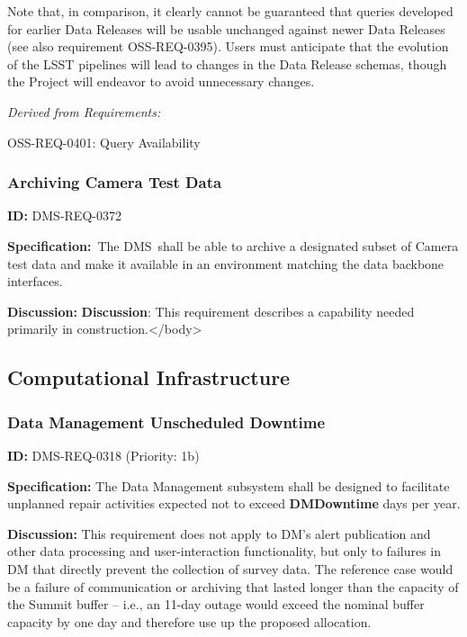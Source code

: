 \documentclass[SE,toc,lsstdraft]{lsstdoc}
\begin{document}
Note that, in comparison, it clearly cannot be guaranteed that queries developed for earlier Data Releases will be usable unchanged against newer Data Releases (see also requirement OSS-REQ-0395). Users must anticipate that the evolution of the LSST pipelines will lead to changes in the Data Release schemas, though the Project will endeavor to avoid unnecessary changes.

\emph{Derived from Requirements:}

OSS-REQ-0401:
Query Availability \newline

\subsubsection{Archiving Camera Test Data}

\label{DMS-REQ-0372}
\textbf{ID:} DMS-REQ-0372

\textbf{Specification:} The DMS shall be able to archive a designated subset of Camera test data and make it available in an environment matching the data backbone interfaces.

\textbf{Discussion:}
\textbf{Discussion}: This requirement describes a capability needed primarily in construction.</body>

\subsection{Computational Infrastructure}

\subsubsection{Data Management Unscheduled Downtime}

\label{DMS-REQ-0318}
\textbf{ID:} DMS-REQ-0318 (Priority: 1b)

\textbf{Specification:} The Data Management subsystem shall be designed to facilitate unplanned repair activities expected not to exceed \textbf{DMDowntime} days per year.

\textbf{Discussion:} This requirement does not apply to DM's alert publication and other data processing and user-interaction functionality, but only to failures in DM that directly prevent the collection of survey data. The reference case would be a failure of communication or archiving that lasted longer than the capacity of the Summit buffer -- i.e., an 11-day outage would exceed the nominal buffer capacity by one day and therefore use up the proposed allocation.
\end{document}
